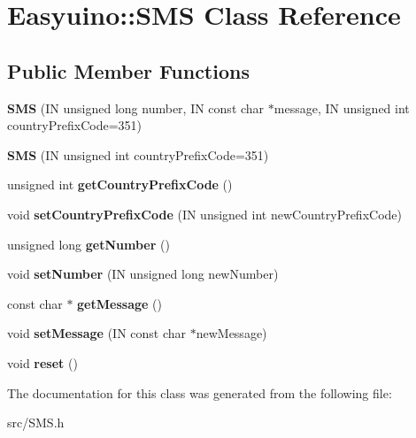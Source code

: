 \hypertarget{class_easyuino_1_1_s_m_s}{}\section{Easyuino\+:\+:S\+MS Class Reference}
\label{class_easyuino_1_1_s_m_s}
\subsection*{Public Member Functions}
\begin{DoxyCompactItemize}
\item 
\mbox{\label{class_easyuino_1_1_s_m_s_a5c56de204df53688169644314e8f0efe}} 
{\bfseries S\+MS} (IN unsigned long number, IN const char $\ast$message, IN unsigned int country\+Prefix\+Code=351)
\item 
\mbox{\label{class_easyuino_1_1_s_m_s_a9088a459857f18c463d3ad198bbe0abd}} 
{\bfseries S\+MS} (IN unsigned int country\+Prefix\+Code=351)
\item 
\mbox{\label{class_easyuino_1_1_s_m_s_aef79317e0ee7511d85814a10aaa15e14}} 
unsigned int {\bfseries get\+Country\+Prefix\+Code} ()
\item 
\mbox{\label{class_easyuino_1_1_s_m_s_a05650de23138fee2dfc1ce9a8e2b0429}} 
void {\bfseries set\+Country\+Prefix\+Code} (IN unsigned int new\+Country\+Prefix\+Code)
\item 
\mbox{\label{class_easyuino_1_1_s_m_s_ab46be8f783d59208245e9d14d3a046d5}} 
unsigned long {\bfseries get\+Number} ()
\item 
\mbox{\label{class_easyuino_1_1_s_m_s_a6d9b21c6480b7e859dfb16688090ed1c}} 
void {\bfseries set\+Number} (IN unsigned long new\+Number)
\item 
\mbox{\label{class_easyuino_1_1_s_m_s_ac13745969d572629274ae69f3f98ab2e}} 
const char $\ast$ {\bfseries get\+Message} ()
\item 
\mbox{\label{class_easyuino_1_1_s_m_s_a7c0fdcb9b1a54cf025c6b98618badc21}} 
void {\bfseries set\+Message} (IN const char $\ast$new\+Message)
\item 
\mbox{\label{class_easyuino_1_1_s_m_s_a0f4b83fa7be59e7efa85c4d8e36ec8e3}} 
void {\bfseries reset} ()
\end{DoxyCompactItemize}


The documentation for this class was generated from the following file\+:\begin{DoxyCompactItemize}
\item 
src/S\+M\+S.\+h\end{DoxyCompactItemize}
